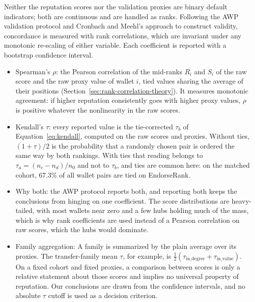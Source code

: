 
Neither the reputation scores nor the validation proxies are binary default indicators; both are continuous and are handled as ranks. Following the AWP validation protocol and Cronbach and Meehl's approach to construct validity, concordance is measured with rank correlations, which are invariant under any monotonic re-scaling of either variable. Each coefficient is reported with a bootstrap confidence interval.

\begin{itemize}
\item Spearman's $\rho$: the Pearson correlation of the mid-ranks $R_i$ and $S_i$ of the raw score and the raw proxy value of wallet $i$, tied values sharing the average of their positions (Section~\ref{sec:rank-correlation-theory}). It measures monotonic agreement: if higher reputation consistently goes with higher proxy values, $\rho$ is positive whatever the nonlinearity in the raw scores.

\item Kendall's $\tau$: every reported value is the tie-corrected $\tau_b$ of Equation~\eqref{eq:kendall}, computed on the raw scores and proxies. Without ties, $(1+\tau)/2$ is the probability that a randomly chosen pair is ordered the same way by both rankings. With ties that reading belongs to $\tau_a=(n_c-n_d)/n_0$ and not to $\tau_b$, and ties are common here: on the matched cohort, $67.3\%$ of all wallet pairs are tied on EndorseRank.

\item Why both: the AWP protocol  reports both, and reporting both keeps the conclusions from hinging on one coefficient. The score distributions are heavy-tailed, with most wallets near zero and a few hubs holding much of the mass, which is why rank coefficients are used instead of a Pearson correlation on raw scores, which the hubs would dominate.

\item Family aggregation: A family is summarized by the plain average over its proxies. The transfer-family mean $\tau$, for example, is $\tfrac{1}{2}(\tau_{\mathrm{in\_degree}}+\tau_{\mathrm{in\_value}})$. On a fixed cohort and fixed proxies, a comparison between scores is only a relative statement about those scores and implies no universal property of reputation. Our conclusions are drawn from the confidence intervals, and no absolute $\tau$ cutoff is used as a decision criterion.


\end{itemize}
